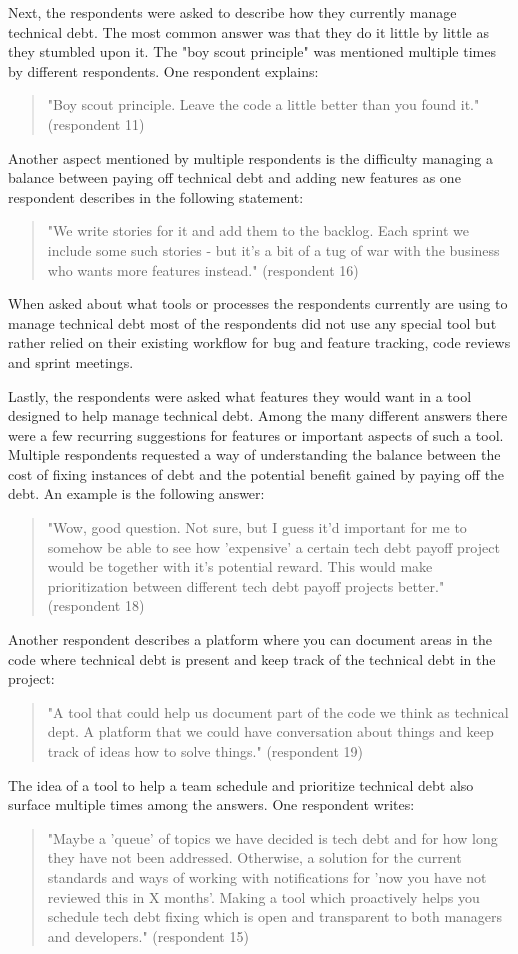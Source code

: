 Next, the respondents were asked to describe how they currently manage technical debt.
The most common answer was that they do it little by little as they stumbled upon it.
The "boy scout principle" was mentioned multiple times by different respondents.
One respondent explains:
\begin{quote}
  "Boy scout principle. Leave the code a little better than you found it." (respondent 11)
\end{quote}
Another aspect mentioned by multiple respondents is the difficulty managing a balance between paying off technical debt and adding new features as one respondent describes in the following statement: 
\begin{quote}
  "We write stories for it and add them to the backlog. Each sprint we include some such stories - but it's a bit of a tug of war with the business who wants more features instead." (respondent 16)
\end{quote}

When asked about what tools or processes the respondents currently are using to manage technical debt most of the respondents did not use any special tool but rather relied on their existing workflow for bug and feature tracking, code reviews and sprint meetings.

Lastly, the respondents were asked what features they would want in a tool designed to help manage technical debt.
Among the many different answers there were a few recurring suggestions for features or important aspects of such a tool.
Multiple respondents requested a way of understanding the balance between the cost of fixing instances of debt and the potential benefit gained by paying off the debt. An example is the following answer:
\begin{quote}
  "Wow, good question. Not sure, but I guess it'd important for me to somehow be able to see how 'expensive' a certain tech debt payoff project would be together with it's potential reward. This would make prioritization between different tech debt payoff projects better." (respondent 18)
\end{quote}
Another respondent describes a platform where you can document areas in the code where technical debt is present and keep track of the technical debt in the project:
\begin{quote}
  "A tool that could help us document part of the code we think as technical dept. A platform that we could have conversation about things and keep track of ideas how to solve things." (respondent 19)
\end{quote}
The idea of a tool to help a team schedule and prioritize technical debt also surface multiple times among the answers. One respondent writes:
\begin{quote}
  "Maybe a 'queue' of topics we have decided is tech debt and for how long they have not been addressed. Otherwise, a solution for the current standards and ways of working with notifications for 'now you have not reviewed this in X months'. Making a tool which proactively helps you schedule tech debt fixing which is open and transparent to both managers and developers." (respondent 15)
\end{quote} 

